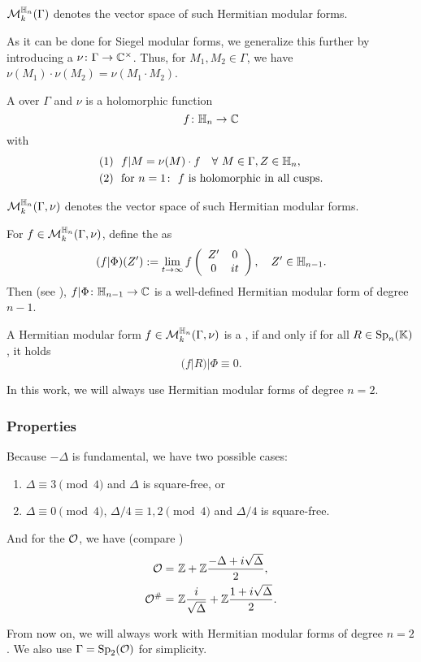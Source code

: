$\operatorname{\mathcal{M}}^{\mathbb{H}_{n}}_k (\Gamma)$
denotes the vector space of such Hermitian modular forms.

As it can be done for Siegel modular forms, we generalize this further by introducing a  $\nu \colon \Gamma \rightarrow \mathbb{C}^\times$. Thus, for $M_1, M_2 \in \Gamma$, we have $\nu(M_1) \cdot \nu(M_2) = \nu(M_1 \cdot M_2)$.

A  over $\Gamma$ and $\nu$
is a holomorphic function
\[ f \colon \mathbb{H}_n \rightarrow \mathbb{C} \]
with
\begin{align*}
(1) \ \ & f | M = \nu(M) \cdot f \quad\forall\ M \in \Gamma, Z \in \mathbb{H}_n , \\
(2) \ \ & \text{for } n = 1 \colon \ \text{$f$ is holomorphic in all cusps} .
\end{align*}

$\operatorname{\mathcal{M}}^{\mathbb{H}_{n}}_k (\Gamma,\nu)$
denotes the vector space of such Hermitian modular forms.

For $f \in \operatorname{\mathcal{M}}^{\mathbb{H}_{n}}_k (\Gamma,\nu)$, define the  as
\[ (f | \Phi) (Z') := \lim_{t \rightarrow \infty} f\left( \begin{array}{cc}
Z' & 0 \\
0 & it
\end{array}  \right), \quad Z' \in \mathbb{H}_{n-1} . \]
Then (see \cite{Dern01Herm}), $f|\Phi \colon \mathbb{H}_{n-1} \rightarrow \mathbb{C}$ is a well-defined Hermitian modular form of degree $n-1$.

A Hermitian modular form $f \in \operatorname{\mathcal{M}}^{\mathbb{H}_{n}}_k (\Gamma,\nu)$ is a , if and only if for all $R \in \operatorname{Sp}_n(\mathbb{K})$, it holds
\[ (f|R) | \Phi \equiv 0 . \]

In this work, we will always use Hermitian modular forms of degree $n=2$.

\subsubsection{Properties}
Because $-\Delta$ is fundamental, we have two possible cases:
\begin{enumerate}
\item $\Delta \equiv 3 \pmod{4}$ and $\Delta$ is square-free, or
\item $\Delta \equiv 0 \pmod{4}$, $\Delta/4 \equiv 1,2 \pmod{4}$ and $\Delta/4$ is square-free.
\end{enumerate}
\label{maxorder}
And for the  $\mathcal{O}$, we have (compare \cite{Dern01Herm})
\begin{align*}
\mathcal{O} = &\ \mathbb{Z} +  \mathbb{Z} \frac{-\Delta+i\sqrt{\Delta}}{2} , \\
\mathcal{O}^\# = & \ \mathbb{Z} \frac{i}{\sqrt{\Delta}} + \mathbb{Z} \frac{1 + i\sqrt{\Delta}}{2} .
\end{align*}

From now on, we will always work with Hermitian modular forms of degree $n=2$. We also use $\Gamma = \operatorname{Sp}_2(\mathcal{O})$ for simplicity.

